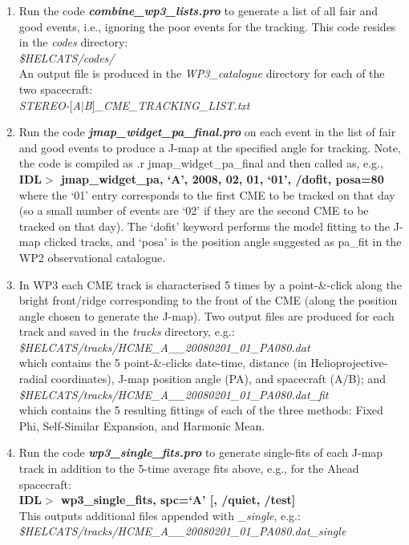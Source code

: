 \documentclass[12pt, a4paper, oneside]{article}
\begin{document}
\begin{enumerate}

\item Run the code {\bf \textit{combine\_wp3\_lists.pro}} to generate a list of all fair and good events, i.e., ignoring the poor events for the tracking. This code resides in the \textit{codes} directory:\\
\textit{\$HELCATS/codes/}\\
An output file is produced in the \textit{WP3\_catalogue} directory for each of the two spacecraft:\\
\textit{STEREO-$[$A$|$B$]$\_CME\_TRACKING\_LIST.txt}

\item Run the code {\bf \textit{jmap\_widget\_pa\_final.pro}} on each event in the list of fair and good events to produce a J-map at the specified angle for tracking. Note, the code is compiled as .r jmap\_widget\_pa\_final and then called as, e.g.,\\
{\bf IDL$>$ jmap\_widget\_pa, `A', 2008, 02, 01, `01', /dofit, posa=80} \\
where the `01' entry corresponds to the first CME to be tracked on that day (so a small number of events are `02' if they are the second CME to be tracked on that day). The `dofit' keyword performs the model fitting to the J-map clicked tracks, and `posa' is the position angle suggested as pa\_fit in the WP2 observational catalogue.

\item In WP3 each CME track is characterised 5 times by a point-\&-click along the bright front/ridge corresponding to the front of the CME (along the position angle chosen to generate the J-map). Two output files are produced for each track and saved in the \textit{tracks} directory, e.g.: \\
\textit{\$HELCATS/tracks/HCME\_A\_\_20080201\_01\_PA080.dat} \\
which contains the 5 point-\&-clicks date-time, distance (in Helioprojective-radial coordinates), J-map position angle (PA), and spacecraft (A/B); and\\
\textit{\$HELCATS/tracks/HCME\_A\_\_20080201\_01\_PA080.dat\_fit} \\
which contains the 5 resulting fittings of each of the three methods: Fixed Phi, Self-Similar Expansion, and Harmonic Mean.

\item Run the code {\bf \textit{wp3\_single\_fits.pro}} to generate single-fits of each J-map track in addition to the 5-time average fits above, e.g., for the Ahead spacecraft:\\
{\bf IDL$>$ wp3\_single\_fits, spc=`A' [, /quiet, /test]} \\
This outputs additional files appended with \textit{\_single}, e.g.:\\
\textit{\$HELCATS/tracks/HCME\_A\_\_20080201\_01\_PA080.dat\_single}



\end{enumerate}
\end{document}
